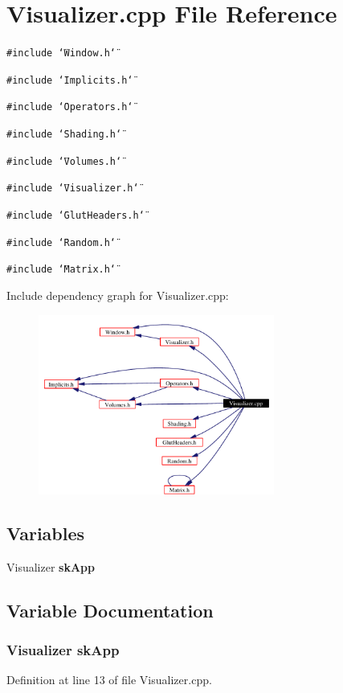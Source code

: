\section{Visualizer.cpp File Reference}
\label{Visualizer_8cpp}
{\tt \#include \char`\"{}Window.h\char`\"{}}\par
{\tt \#include \char`\"{}Implicits.h\char`\"{}}\par
{\tt \#include \char`\"{}Operators.h\char`\"{}}\par
{\tt \#include \char`\"{}Shading.h\char`\"{}}\par
{\tt \#include \char`\"{}Volumes.h\char`\"{}}\par
{\tt \#include \char`\"{}Visualizer.h\char`\"{}}\par
{\tt \#include \char`\"{}Glut\-Headers.h\char`\"{}}\par
{\tt \#include \char`\"{}Random.h\char`\"{}}\par
{\tt \#include \char`\"{}Matrix.h\char`\"{}}\par


Include dependency graph for Visualizer.cpp:\begin{figure}[H]
\begin{center}
\leavevmode
\includegraphics[width=220pt]{Visualizer_8cpp__incl}
\end{center}
\end{figure}
\subsection*{Variables}
\begin{CompactItemize}
\item 
Visualizer {\bf sk\-App}
\end{CompactItemize}


\subsection{Variable Documentation}
\subsubsection{\setlength{\rightskip}{0pt plus 5cm}Visualizer sk\-App}\label{Visualizer_8cpp_a0}




Definition at line 13 of file Visualizer.cpp.